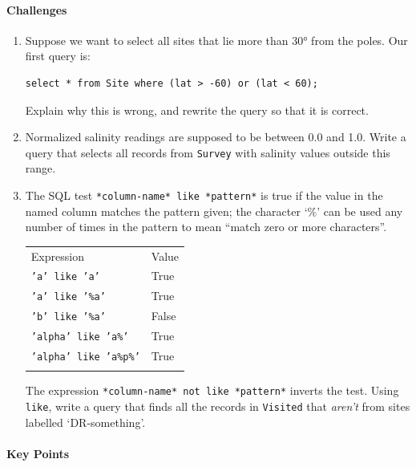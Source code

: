 \documentclass[]{book}
\begin{document}
\mbox{}\paragraph{Challenges}

\begin{enumerate}
\item
  Suppose we want to select all sites that lie more than 30° from the
  poles. Our first query is:

\begin{verbatim}
select * from Site where (lat > -60) or (lat < 60);
\end{verbatim}

  Explain why this is wrong, and rewrite the query so that it is
  correct.
\item
  Normalized salinity readings are supposed to be between 0.0 and 1.0.
  Write a query that selects all records from \texttt{Survey} with
  salinity values outside this range.
\item
  The SQL test \texttt{*column-name* like *pattern*} is true if the
  value in the named column matches the pattern given; the character
  `\%' can be used any number of times in the pattern to mean ``match
  zero or more characters''.

  \begin{longtable}[c]{@{}ll@{}}
  \hline\noalign{\medskip}
  Expression & Value
  \\\noalign{\medskip}
  \hline\noalign{\medskip}
  \texttt{'a' like 'a'} & True
  \\\noalign{\medskip}
  \texttt{'a' like '\%a'} & True
  \\\noalign{\medskip}
  \texttt{'b' like '\%a'} & False
  \\\noalign{\medskip}
  \texttt{'alpha' like 'a\%'} & True
  \\\noalign{\medskip}
  \texttt{'alpha' like 'a\%p\%'} & True
  \\\noalign{\medskip}
  \hline
  \end{longtable}

  The expression \texttt{*column-name* not like *pattern*} inverts the
  test. Using \texttt{like}, write a query that finds all the records in
  \texttt{Visited} that \emph{aren't} from sites labelled
  `DR-something'.
\end{enumerate}

\mbox{}\paragraph{Key Points}
\end{document}
